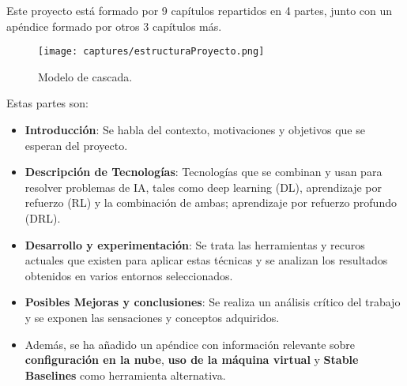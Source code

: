 \documentclass[11pt,fleqn]{book} %
\begin{document}
Este proyecto está formado por 9 capítulos repartidos en 4 partes, junto con un apéndice formado por otros 3 capítulos más.

\begin{figure}[H]
	\centering\texttt{[image: captures/estructuraProyecto.png]}
	\caption{Modelo de cascada.}
	\label{fig:estructuraProyecto} %
\end{figure}

Estas partes son: \\

\begin{itemize}
	\item \textbf{Introducción}: Se habla del contexto, motivaciones y objetivos que se esperan del proyecto. \\
	
	\item \textbf{Descripción de Tecnologías}: Tecnologías que se combinan y usan para resolver problemas de IA, tales como deep learning (DL), aprendizaje por refuerzo (RL) y la combinación de ambas; aprendizaje por refuerzo profundo (DRL).\\
	
	\item \textbf{Desarrollo y experimentación}: Se trata las herramientas y recuros actuales que existen para aplicar estas técnicas y se analizan los resultados obtenidos en varios entornos seleccionados.\\
	
	
	\item \textbf{Posibles Mejoras y conclusiones}: Se realiza un análisis crítico del trabajo y se exponen las sensaciones y conceptos adquiridos. \\
	
	\item Además, se ha añadido un apéndice con información relevante sobre \textbf{configuración en la nube}, \textbf{uso de la máquina virtual} y \textbf{Stable Baselines} como herramienta alternativa.
\end{itemize}
\end{document}
